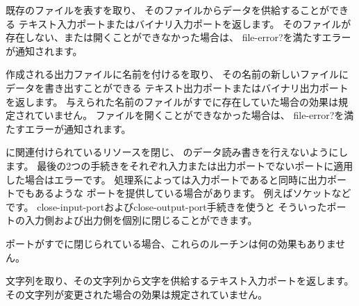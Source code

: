 \begin{entry}{%
}
 
既存のファイルを表すを取り、
そのファイルからデータを供給することができる
テキスト入力ポートまたはバイナリ入力ポートを返します。
そのファイルが存在しない、または開くことができなかった場合は、
{\cf file-error?}を満たすエラーが通知されます。

\end{entry}


\begin{entry}{%
}

作成される出力ファイルに名前を付けるを取り、
その名前の新しいファイルにデータを書き出すことができる
テキスト出力ポートまたはバイナリ出力ポートを返します。
与えられた名前のファイルがすでに存在していた場合の効果は規定されていません。
ファイルを開くことができなかった場合は、
{\cf file-error?}を満たすエラーが通知されます。

\end{entry}


\begin{entry}{%
}

に関連付けられているリソースを閉じ、
のデータ読み書きを行えないようにします。
最後の2つの手続きをそれぞれ入力または出力ポートでないポートに適用した場合はエラーです。
処理系によっては入力ポートであると同時に出力ポートでもあるような
ポートを提供している場合があります。
例えばソケットなどです。
{\cf close-input-port}および{\cf close-output-port}手続きを使うと
そういったポートの入力側および出力側を個別に閉じることができます。

ポートがすでに閉じられている場合、これらのルーチンは何の効果もありません。


\end{entry}

\begin{entry}{%
}

文字列を取り、その文字列から文字を供給するテキスト入力ポートを返します。
その文字列が変更された場合の効果は規定されていません。

\end{entry}

